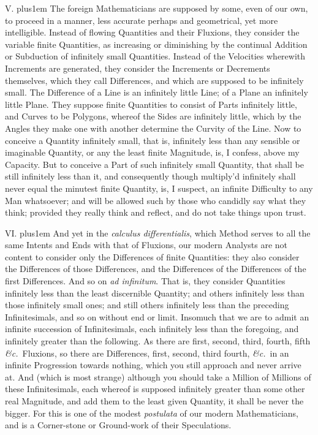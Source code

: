 V. \hskip 0pt plus1em
The foreign Mathematicians are supposed by some, even of our own,
to proceed in a manner, less accurate perhaps and geometrical,
yet more intelligible.  Instead of flowing Quantities and their
Fluxions, they consider the variable finite Quantities, as
increasing or diminishing by the continual Addition or Subduction
of infinitely small Quantities.  Instead of the Velocities
wherewith Increments are generated, they consider the Increments
or Decrements themselves, which they call Differences, and which
are supposed to be infinitely small.  The Difference of a Line is
an infinitely little Line; of a Plane an infinitely little Plane.
They suppose finite Quantities to consist of Parts infinitely
little, and Curves to be Polygons, whereof the Sides are
infinitely little, which by the Angles they make one with another
determine the Curvity of the Line.  Now to conceive a Quantity
infinitely small, that is, infinitely less than any sensible or
imaginable Quantity, or any the least finite Magnitude, is, I
confess, above my Capacity.  But to conceive a Part of such
infinitely small Quantity, that shall be still infinitely less
than it, and consequently though multiply'd infinitely shall
never equal the minutest finite Quantity, is, I suspect, an
infinite Difficulty to any Man whatsoever; and will be allowed
such by those who candidly say what they think; provided they
really think and reflect, and do not take things upon trust.


\medbreak

VI. \hskip 0pt plus1em
And yet in the {\it calculus differentialis}, which Method serves
to all the same Intents and Ends with that of Fluxions, our
modern Analysts are not content to consider only the Differences
of finite Quantities: they also consider the Differences of those
Differences, and the Differences of the Differences of the first
Differences.  And so on {\it ad infinitum}.  That is, they
consider Quantities infinitely less than the least discernible
Quantity; and others infinitely less than those infinitely small
ones; and still others infinitely less than the preceding
Infinitesimals, and so on without end or limit.  Insomuch that we
are to admit an infinite succession of Infinitesimals, each
infinitely less than the foregoing, and infinitely greater than
the following.  As there are first, second, third, fourth, fifth
{\it \&c.}\ Fluxions, so there are Differences, first, second,
third fourth, {\it \&c.}\ in an infinite Progression towards
nothing, which you still approach and never arrive at.  And
(which is most strange) although you should take a Million of
Millions of these Infinitesimals, each whereof is supposed
infinitely greater than some other real Magnitude, and add them
to the least given Quantity, it shall be never the bigger.  For
this is one of the modest {\it postulata\/} of our modern
Mathematicians, and is a Corner-stone or Ground-work of their
Speculations.

